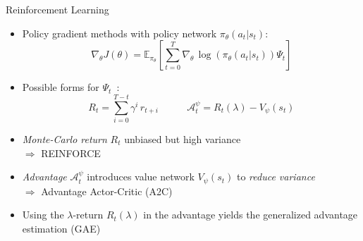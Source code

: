 \documentclass[table]{beamer}
\begin{document}
\begin{frame}{Reinforcement Learning}
\begin{itemize}
  \item Policy gradient methods with policy network $\pi_{\theta} (a_t | s_t)$:
  \begin{equation*}
    \nabla_{\theta} J (\theta) = \mathbb{E}_{\pi_\theta} \left[ \sum_{t=0}^T \nabla_\theta \, \log(\pi_\theta (a_t | s_t)) \Psi_t \right] 
    \label{eq:polupdate}
  \end{equation*}
  \item<2-> Possible forms for $\Psi_t$~{\scriptsize\cite{Schulman2016GAE}}:
    \begin{equation*}
    R_t = \sum_{i=0}^{T-t} \gamma^{i} \, r_{t+i} \ \ \ \ \ \ \ \ \ \ \ \ \
      \mathcal{A}_t^\psi = R_t(\lambda) - V_\psi(s_t)
    \end{equation*}
  \item<3-> \emph{Monte-Carlo return} $R_t$ unbiased but high variance\\$\Rightarrow$ REINFORCE
  \item<3-> \emph{Advantage} $\mathcal{A}_t^{\psi}$ introduces value network $V_{\psi}(s_t)$ to \emph{reduce variance}\\$\Rightarrow$ Advantage Actor-Critic (A2C)~{\scriptsize\cite{Mnih2016A2C}}
  \item<3-> Using the $\lambda$-return $R_t(\lambda)$ in the advantage yields the generalized advantage estimation (GAE)~{\scriptsize\cite{Schulman2016GAE}}
\end{itemize}

\end{frame}
\end{document}
